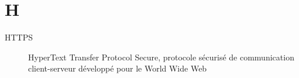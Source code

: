 \section{H}

\begin{description}

\item[HTTPS] HyperText Transfer Protocol Secure, protocole sécurisé de communication client-serveur développé pour le World Wide Web

\end{description}
